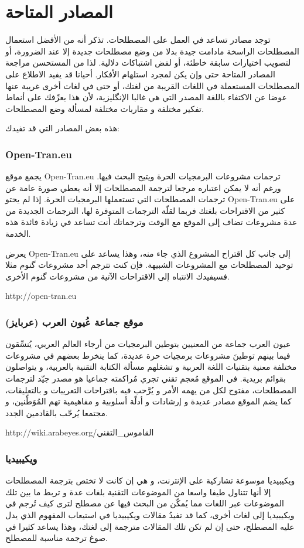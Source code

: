 \section{المصادر المتاحة}
توجد مصادر تساعد في العمل على المصطلحات. تذكر أنه من الأفضل استعمال
المصطلحات الراسخة مادامت جيدة بدلا من وضع مصطلحات جديدة إلا عند
الضرورة، أو لتصويب اختيارات سابقة خاطئة، أو لفض اشتباكات دلالية. لذا من
المستحسن مراجعة المصادر المتاحة حتى وإن يكن لمجرد استلهام الأفكار.
أحيانا قد يفيد الاطلاع على المصطلحات المستعملة في اللغات القريبة من
لغتك، أو حتى في لغات أخرى غريبة عنها عوضا عن الاكتفاء باللغة المصدر
التي هي غالبا الإنگليزية، لأن هذا يعرِّفك على أنماط تفكير مختلفة و
مقاربات مختلفة لمسألة وضع المصطلحات.

هذه بعض المصادر التي قد تفيدك:

\subsubsection{Open-Tran.eu}
يجمع موقع Open-Tran.eu ترجمات مشروعات البرمجيات الحرة ويتيح البحث فيها.
ورغم أنه لا يمكن اعتباره مرجعا لترجمة المصطلحات إلا أنه يعطي صورة عامة
عن ترجمات المصطلحات التي تستعملها البرمجيات الحرة. إذا لم يحتو
Open-Tran.eu على كثير من الاقتراحات بلغتك فربما لقلّة الترجمات المتوفرة
لها، الترجمات الجديدة من عدة مشروعات تضاف إلى الموقع مع الوقت وترجماتك
أنت تساعد في زيادة فائدة هذه الخدمة.

يعرض Open-Tran.eu إلى جانب كل اقتراح المشروع الذي جاء منه، وهذا يساعد
على توحيد المصطلحات مع المشروعات الشبيهة. فإن كنت تترجم أحد مشروعات
گنوم مثلا فسيفيدك الانتباه إلى الاقتراحات الآتية من مشروعات گنوم
الأخرى.

http://open-tran.eu

\subsubsection{موقع جماعة عُيون العرب (عربايز)}
عيون العرب جماعة من المعنيين بتوطين البرمجيات من أرجاء العالم العربي،
يُنسِّقون فيما بينهم توطينَ مشروعات برمجيات حرة عديدة، كما ينخرط بعضهم
في مشروعات مختلفة معنية بتقنيات اللغة العربية و تشغلهم مسألة الكتابة
التقنية بالعربية، و يتواصلون بقوائم بريدية. في الموقع مُعجم تقني تجري
مُراكمته جماعيا هو مصدر جيّد لترجمات المصطلحات، مفتوح لكل من يهمه الأمر
و يُرَّحب فيه باقتراحات التعريبات و بالتعليقات، كما يضم الموقع مصادر
عديدة و إرشادات و أدلّة أسلوبية و مفاهيمية تهم المُوَطِّنين، و مجتمعا
يُرحّب بالقادمين الجدد.

http://wiki.arabeyes.org/القاموس\_التقني

\subsubsection{ويكيبيديا}
ويكيبيديا موسوعة تشاركية على الإنترنت، و هي إن كانت لا تختص بترجمة
المصطلحات إلا أنها تتناول طيفا واسعا من الموضوعات التقنية بلغات عدة و
تربط ما بين تلك الموضوعات عبر اللغات مما يُمكّن من البحث فيها عن مصطلح
لترى كيف تُرجم في ويكيبيديا إلى لغات أخرى، كما قد تفيدُ مقالات
ويكيبيديا في استيعاب المفهوم الذي يدل عليه المصطلح، حتى إن لم تكن تلك
المقالات مترجمة إلى لغتك، وهذا يساعد كثيرا في صوغ ترجمة مناسبة للمصطلح.

